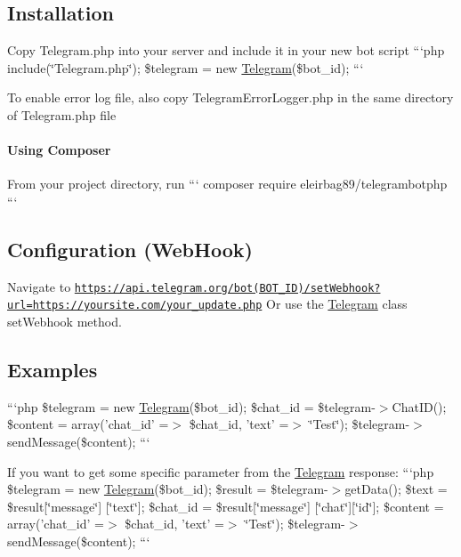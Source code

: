 \subsection*{Installation }


\begin{DoxyItemize}
\item Copy Telegram.\-php into your server and include it in your new bot script ```php include(\char`\"{}\-Telegram.\-php\char`\"{}); \$telegram = new \hyperlink{class_telegram}{Telegram}(\$bot\-\_\-id); ```
\item To enable error log file, also copy Telegram\-Error\-Logger.\-php in the same directory of Telegram.\-php file
\end{DoxyItemize}

\paragraph*{Using Composer}

From your project directory, run ``` composer require eleirbag89/telegrambotphp ```

\subsection*{Configuration (Web\-Hook) }

Navigate to \href{https://api.telegram.org/bot(BOT_ID)/setWebhook?url=https://yoursite.com/your_update.php}{\tt https\-://api.\-telegram.\-org/bot(\-B\-O\-T\-\_\-\-I\-D)/set\-Webhook?url=https\-://yoursite.\-com/your\-\_\-update.\-php} Or use the \hyperlink{class_telegram}{Telegram} class set\-Webhook method.

\subsection*{Examples }

```php \$telegram = new \hyperlink{class_telegram}{Telegram}(\$bot\-\_\-id); \$chat\-\_\-id = \$telegram-\/$>$Chat\-I\-D(); \$content = array('chat\-\_\-id' =$>$ \$chat\-\_\-id, 'text' =$>$ \char`\"{}\-Test\char`\"{}); \$telegram-\/$>$send\-Message(\$content); ```

If you want to get some specific parameter from the \hyperlink{class_telegram}{Telegram} response\-: ```php \$telegram = new \hyperlink{class_telegram}{Telegram}(\$bot\-\_\-id); \$result = \$telegram-\/$>$get\-Data(); \$text = \$result\mbox{[}\char`\"{}message\char`\"{}\mbox{]} \mbox{[}\char`\"{}text\char`\"{}\mbox{]}; \$chat\-\_\-id = \$result\mbox{[}\char`\"{}message\char`\"{}\mbox{]} \mbox{[}\char`\"{}chat\char`\"{}\mbox{]}\mbox{[}\char`\"{}id\char`\"{}\mbox{]}; \$content = array('chat\-\_\-id' =$>$ \$chat\-\_\-id, 'text' =$>$ \char`\"{}\-Test\char`\"{}); \$telegram-\/$>$send\-Message(\$content); ```


